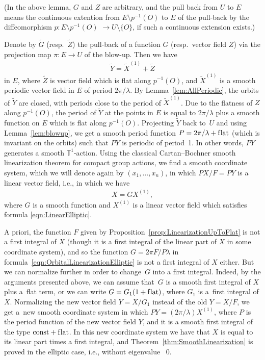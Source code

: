 \documentclass[11pt]{article}
\numberwithin{equation}{section}
\newcommand{\bbT}{\mathbb T}
\begin{document}
(In the above lemma, $G$ and $Z$ are arbitrary, and the pull back from
$U$ to $E$ means the con\-ti\-nuous extention from $E \setminus p^{-1}(O)$
to $E$ of the pull-back by the dif\/feomorphism $p\colon E \setminus p^{-1}(O)$ $\to U \setminus \{O\}$, if such a continuous extension exists.)

Denote by $\tilde G$ (resp.~$\tilde Z$) the pull-back of a function $G$ (resp.\ vector f\/ield $Z$) via the projection
map $\pi\colon E \to U$ of the blow-up. Then we have
\begin{gather*}
\tilde Y = \tilde X^{(1)} + \tilde Z
\end{gather*}
in $E$, where $\tilde Z$ is vector f\/ield which is f\/lat along $p^{-1}(O)$, and $\tilde X^{(1)}$ is a smooth periodic vector f\/ield
in $E$ of period $2\pi/\lambda$. By Lemma~\ref{lem:AllPeriodic}, the orbits of $\tilde Y$ are closed, with periods close
to the period of $\tilde X^{(1)}$. Due to the f\/latness of $Z$ along $p^{-1}(O)$, the period of $\tilde Y$ at the points in $E$
is equal to $2\pi/\lambda$ plus a smooth function on $E$ which is f\/lat along $p^{-1}(O)$. Projecting $\tilde Y$ back to~$U$
and using Lemma~\ref{lem:blowup}, we get a smooth period function $P = 2\pi/\lambda + \text{f\/lat}$
(which is invariant on the orbits)
such that $PY$ is periodic of period~1.
In other words, $PY$ generates a smooth $\bbT^1$-action. Using the classical Cartan--Bochner
smooth linearization theorem
for compact group actions, we f\/ind a smooth coordinate system, which we will denote again by $(x_1,\dots,x_n)$,
in which $PX/F = PY$ is a linear vector f\/ield, i.e., in which we have
\begin{gather} \label{eqn:OrbitalLinearizationElliptic}
X = GX^{(1)},
\end{gather}
where $G$ is a smooth function and $X^{(1)}$ is a linear vector f\/ield which satisf\/ies formula \eqref{eqn:LinearElliptic}.

A priori, the function $F$ given by Proposition~\ref{prop:LinearizationUpToFlat} is not a f\/irst integral of $X$
(though it is a f\/irst integral of the linear part of $X$ in some coordinate system), and so the function
$G = 2\pi F/P \lambda$ in formula~\eqref{eqn:OrbitalLinearizationElliptic} is not a f\/irst integral of $X$ either.
But we can normalize further in order to change~$G$ into a f\/irst integral. Indeed, by the arguments presented above,
we can assume that~$G$ is a smooth f\/irst integral of $X$ plus a~f\/lat term, or we can write $G = G_1 (1+ \text{f\/lat})$, where
$G_1$ is a~f\/irst integral of $X$. Normalizing the new vector f\/ield $Y = X/G_1$ instead of the old $Y = X/F$, we get a~new smooth coordinate system in which $PY = (2\pi/\lambda) X^{(1)}$, where $P$ is the period function of the new vector f\/ield $Y$,
and it is a smooth f\/irst integral of the type $\text{const} + \text{f\/lat}$. In this new coordinate system we have that $X$ is equal to
its linear part times a f\/irst integral, and Theorem~\ref{thm:SmoothLinearization}
is proved in the elliptic case, i.e., without eigenvalue ~0.
\end{document}
